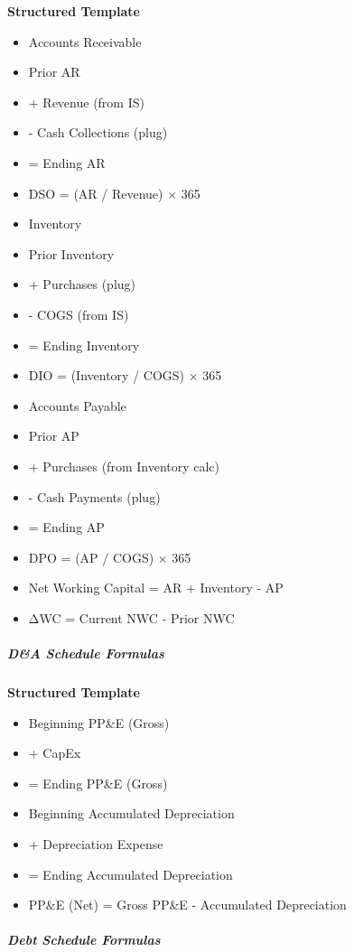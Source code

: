 \documentclass[11pt]{article}
\begin{document}
\textbf{Structured Template}
\begin{itemize}[leftmargin=*,itemsep=2pt,topsep=2pt]
\item {} Accounts Receivable
\item {} Prior AR
\item {} + Revenue (from IS)
\item {} - Cash Collections (plug)
\item {} = Ending AR
\item {} DSO = (AR / Revenue) × 365
\item {} Inventory
\item {} Prior Inventory
\item {} + Purchases (plug)
\item {} - COGS (from IS)
\item {} = Ending Inventory
\item {} DIO = (Inventory / COGS) × 365
\item {} Accounts Payable
\item {} Prior AP
\item {} + Purchases (from Inventory calc)
\item {} - Cash Payments (plug)
\item {} = Ending AP
\item {} DPO = (AP / COGS) × 365
\item {} Net Working Capital = AR + Inventory - AP
\item {} ΔWC = Current NWC - Prior NWC
\end{itemize}

\subparagraph{D\&A Schedule Formulas}\mbox{}\par

\textbf{Structured Template}
\begin{itemize}[leftmargin=*,itemsep=2pt,topsep=2pt]
\item {} Beginning PP\&E (Gross)
\item {} + CapEx
\item {} = Ending PP\&E (Gross)
\item {} Beginning Accumulated Depreciation
\item {} + Depreciation Expense
\item {} = Ending Accumulated Depreciation
\item {} PP\&E (Net) = Gross PP\&E - Accumulated Depreciation
\end{itemize}

\subparagraph{Debt Schedule Formulas}\mbox{}\par
\end{document}
